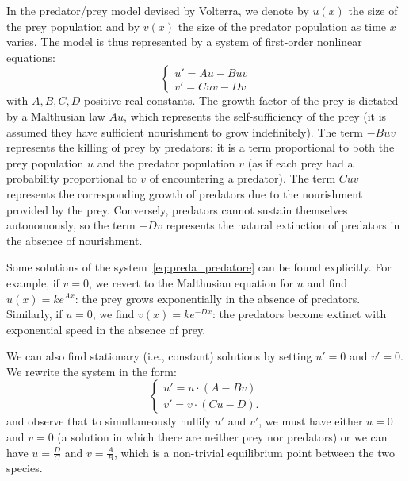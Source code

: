 In the predator/prey model devised by Volterra, we denote by $u(x)$ the size of
the prey population and by $v(x)$ the size of the predator population as time
$x$ varies. The model is thus represented by a system of first-order nonlinear
equations:
\begin{equation}\label{eq:preda_predatore}
  \begin{cases}
    u' = A u - B u v \\
    v' = C u v - D v
  \end{cases}
\end{equation}
with $A,B,C,D$ positive real constants. The growth factor of the prey is
dictated by a Malthusian law $A u$, which represents the self-sufficiency of the
prey (it is assumed they have sufficient nourishment to grow indefinitely). The
term $-B u v$ represents the killing of prey by predators: it is a term
proportional to both the prey population $u$ and the predator population $v$ (as
if each prey had a probability proportional to $v$ of encountering a predator).
The term $C u v$ represents the corresponding growth of predators due to the
nourishment provided by the prey. Conversely, predators cannot sustain
themselves autonomously, so the term $-D v$ represents the natural extinction of
predators in the absence of nourishment.

Some solutions of the system~\eqref{eq:preda_predatore} can be found explicitly.
For example, if $v=0$, we revert to the Malthusian equation for $u$ and find
$u(x) = k e^{Ax}$: the prey grows exponentially in the absence of predators.
Similarly, if $u=0$, we find $v(x) = k e^{-Dx}$: the predators become extinct
with exponential speed in the absence of prey.

We can also find stationary (i.e., constant) solutions by setting $u'=0$ and
$v'=0$. We rewrite the system in the form:
\begin{equation}\label{eq:preda_predatore_2}
  \begin{cases}
    u' = u \cdot (A - B v) \\
    v' = v \cdot (C u - D).
  \end{cases}
\end{equation}
and observe that to simultaneously nullify $u'$ and $v'$, we must have either
$u=0$ and $v=0$ (a solution in which there are neither prey nor predators) or we
can have $u=\frac D C$ and $v=\frac A B$, which is a non-trivial equilibrium
point between the two species.

